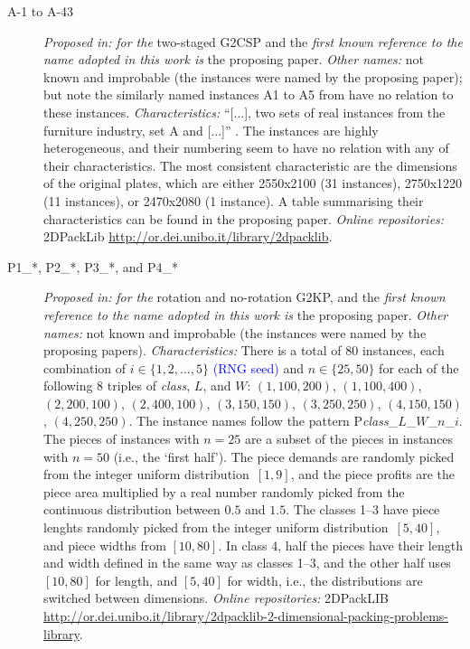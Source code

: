 \documentclass[ppgc,tese,english,formais,babel]{iiufrgs}
\newif\iffinalversion
\newcommand{\newtext}[1]{\iffinalversion%
#1%
\else%
\textcolor{blue}{#1}%
\fi%
}
\begin{document}
\begin{description}
\item[A-1 to A-43] \emph{Proposed in:} \citet{macedo:2010} \emph{for the} two-staged G2CSP and the \emph{first known reference to the name adopted in this work is} the proposing paper. \emph{Other names:} not known and improbable (the instances were named by the proposing paper); but note the similarly named instances A1 to A5 from \citet{hifi:1997} have no relation to these instances. \emph{Characteristics:} ``[...],  two sets of real instances from the furniture industry, set A and [...]'' \citep[p. 7]{macedo:2010}. The instances are highly heterogeneous, and their numbering seem to have no relation with any of their characteristics. The most consistent characteristic are the dimensions of the original plates, which are either 2550x2100 (31 instances), 2750x1220 (11 instances), or 2470x2080 (1 instance). A table summarising their characteristics can be found in the proposing paper. \emph{Online repositories:} 2DPackLib \url{http://or.dei.unibo.it/library/2dpacklib}.
\item [P1\_*, P2\_*, P3\_*, and P4\_*] \emph{Proposed in:} \citet{velasco:2019} \emph{for the} rotation and no-rotation G2KP, and the \emph{first known reference to the name adopted in this work is} the proposing paper. \emph{Other names:} not known and improbable (the instances were named by the proposing papers). \emph{Characteristics: } There is a total of 80 instances, each combination of \(i \in \{1, 2, \dots, 5\}\) \newtext{(RNG seed)} and \(n \in \{25, 50\}\) for each of the following 8 triples of \emph{class}, \(L\), and \(W\): \((1, 100, 200)\), \((1, 100, 400)\), \((2, 200, 100)\), \((2, 400, 100)\), \((3, 150, 150)\), \((3, 250, 250)\), \((4, 150, 150)\), \((4, 250, 250)\). The instance names follow the pattern P\emph{class}\_\(L\)\_\(W\)\_\(n\)\_\(i\). The pieces of instances with \(n = 25\) are a subset of the pieces in instances with \(n = 50\) (i.e., the `first half'). The piece demands are randomly picked from the integer uniform distribution~\([1, 9]\), and the piece profits are the piece area multiplied by a real number randomly picked from the continuous distribution between \(0.5\) and \(1.5\). The classes 1--3 have piece lenghts randomly picked from the integer uniform distribution~\([5, 40]\), and piece widths from \([10, 80]\). In class 4, half the pieces have their length and width defined in the same way as classes 1--3, and the other half uses \([10, 80]\) for length, and \([5, 40]\) for width, i.e., the distributions are switched between dimensions. \emph{Online repositories:} 2DPackLIB \url{http://or.dei.unibo.it/library/2dpacklib-2-dimensional-packing-problems-library}.

\end{description}
\end{document}
